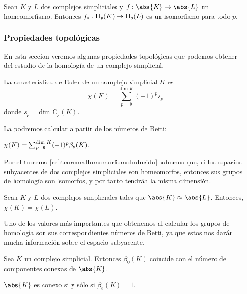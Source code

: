 \begin{theorem}\label{ref:teoremaHomomorfismoInducido}
Sean $K$ y $L$ dos complejos simpliciales y $f: \abs{K} \to \abs{L}$ un homeomorfismo. Entonces $f_{*}: \text{\rm H}_p(K) \to \text{\rm H}_p(L)$ es un isomorfismo para todo $p$.
\end{theorem}


\subsubsection*{Propiedades topológicas}
En esta sección veremos algunas propiedades topológicas que podemos obtener del estudio de la homología de un complejo simplicial.

\begin{definition}
La característica de Euler de un complejo simplicial $K$ es 
\[
\chi(K) = \sum_{p=0}^{\text{dim } K} (-1)^p s_p
\]
donde $s_p = \text{dim } \text{C}_p(K)$.
\end{definition}
La podremos calcular a partir de los números de Betti:
\begin{theorem}
$\chi(K) = \sum_{p=0}^{\text{\rm dim } K} (-1)^p \beta_p(K)$.
\end{theorem}

Por el teorema \ref{ref:teoremaHomomorfismoInducido} sabemos que, si los espacios subyacentes de dos complejos simpliciales son homeomorfos, entonces sus grupos de homología son isomorfos, y por tanto tendrán la misma dimensión.
\begin{corollary}
\begin{sloppypar}
Sean $K$ y $L$ dos complejos simpliciales tales que $\abs{K} \approx \abs{L}$. Entonces, ${\chi(K)=\chi(L)}$.
\end{sloppypar}
\end{corollary}

Uno de los valores más importantes que obtenemos al calcular los grupos de homología son sus correspondientes números de Betti, ya que estos nos darán mucha información sobre el espacio subyacente. 
\begin{theorem}
Sea $K$ un complejo simplicial. Entonces $\beta_0(K)$ coincide con el número de componentes conexas de $\abs{K}$.
\end{theorem}

\begin{corollary}
$\abs{K}$ es conexo si y sólo si $\beta_0(K)=1$.
\end{corollary}

